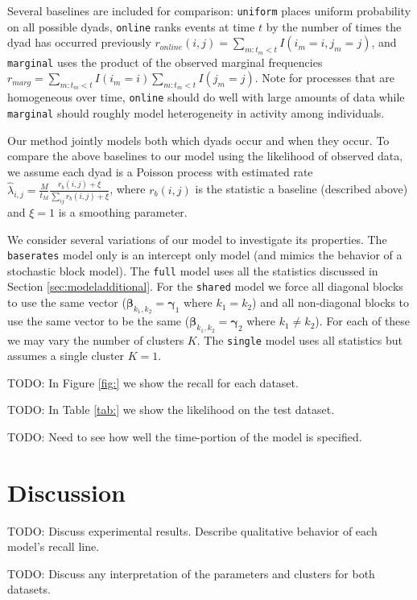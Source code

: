 \documentclass[11pt]{article}
\begin{document}
Several baselines are included for comparison: \texttt{uniform} places uniform probability on all possible dyads, \texttt{online} ranks events at time $t$ by the number of times the dyad has occurred previously $r_{online}(i,j) = \sum_{m:t_m < t} I(i_m=i,j_m=j)$, and \texttt{marginal} uses the product of the observed marginal frequencies $r_{marg} = \sum_{m:t_m < t} I(i_m=i) \sum_{m:t_m < t} I(j_m=j)$.  Note for processes that are homogeneous over time, \texttt{online} should do well with large amounts of data while \texttt{marginal} should roughly model heterogeneity in activity among individuals.  

Our method jointly models both which dyads occur and when they occur.  To compare the above baselines to our model using the likelihood of observed data, we assume each dyad is a Poisson process with estimated  rate $\hat{\lambda}_{i,j} = \frac{M}{t_M} \frac{r_{b}(i,j) + \xi}{\sum_{ij} r_{b}(i,j) + \xi}$, where $r_b(i,j)$ is the statistic a baseline (described above) and $\xi=1$ is a smoothing parameter.

We consider several variations of our model to investigate its properties. The \texttt{baserates} model only is an intercept only model (and mimics the behavior of a stochastic block model).   The \texttt{full} model uses all the statistics discussed in Section \ref{sec:modeladditional}.  For the \texttt{shared} model we force all diagonal blocks to use the same vector ($\boldsymbol{\beta}_{k_1,k_2} = \boldsymbol{\gamma}_1$ where $k_1=k_2$) and all non-diagonal blocks to use the same vector to be the same  ($\boldsymbol{\beta}_{k_1,k_2} = \boldsymbol{\gamma}_2$ where $k_1 \ne k_2$).  For each of these we may vary the number of clusters $K$. The \texttt{single} model uses all statistics but assumes a single cluster $K=1$. 

TODO: In Figure \ref{fig:} we show the recall for each dataset.

TODO: In Table \ref{tab:} we show the likelihood on the test dataset.

TODO: Need to see how well the time-portion of the model is specified.

\section{Discussion}

TODO: Discuss experimental results.  Describe qualitative behavior of each model's recall line.

TODO: Discuss any interpretation of the parameters and clusters for both datasets.
\end{document}
